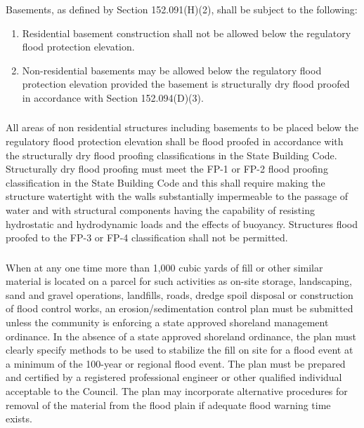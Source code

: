 \subsubsection{}
Basements, as defined by Section 152.091(H)(2), shall be subject to the following:
\begin{enumerate}[{\indent}a)]
    \item Residential basement construction shall not be allowed below the regulatory flood protection elevation.
    \item Non-residential basements may be allowed below the regulatory flood protection elevation provided the basement is structurally dry flood proofed in accordance with Section 152.094(D)(3).
\end{enumerate}
\subsubsection{}
All areas of non residential structures including basements to be placed below the regulatory flood protection elevation shall be flood proofed in accordance with the structurally dry flood proofing classifications in the State Building Code. Structurally dry flood proofing must meet the FP-1 or FP-2 flood proofing classification in the State Building Code and this shall require making the structure watertight with the walls substantially impermeable to the passage of water and with structural components having the capability of resisting hydrostatic and hydrodynamic loads and the effects of buoyancy. Structures flood proofed to the FP-3 or FP-4 classification shall not be permitted.
\subsubsection{}
When at any one time more than 1,000 cubic yards of fill or other similar material is located on a parcel for such activities as on-site storage, landscaping, sand and gravel operations, landfills, roads, dredge spoil disposal or construction of flood control works, an erosion/sedimentation control plan must be submitted unless the community is enforcing a state approved shoreland management ordinance. In the absence of a state approved shoreland ordinance, the plan must clearly specify methods to be used to stabilize the fill on site for a flood event at a minimum of the 100-year or regional flood event. The plan must be prepared and certified by a registered professional engineer or other qualified individual acceptable to the Council. The plan may incorporate alternative procedures for removal of the material from the flood plain if adequate flood warning time exists.
